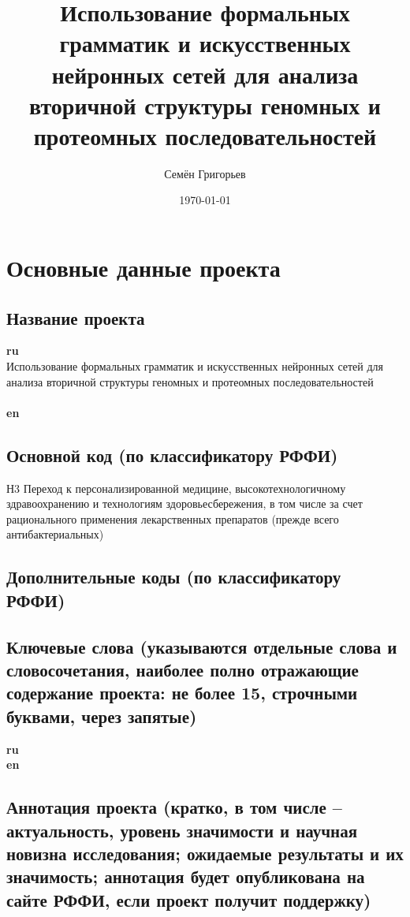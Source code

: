 \documentclass[12pt]{article}  %
\title{Использование формальных грамматик и искусственных нейронных сетей для анализа вторичной структуры геномных и протеомных  последовательностей}
\author{Семён Григорьев}
\date{\today}
\theoremstyle{remark}
\begin{document}

\maketitle

\section{Основные данные проекта}

\subsection{Название проекта}

\textbf{ru}\\
%
Использование формальных грамматик и искусственных нейронных сетей для анализа вторичной структуры геномных и протеомных  последовательностей
\\
\\
\textbf{en}\\

\subsection{Основной код (по классификатору РФФИ)}
%
Н3 Переход к персонализированной медицине, высокотехнологичному здравоохранению и технологиям здоровьесбережения, в том числе за счет рационального применения лекарственных препаратов (прежде всего антибактериальных)

\subsection{Дополнительные коды (по классификатору РФФИ)}

\subsection{Ключевые слова (указываются отдельные слова и словосочетания, наиболее полно отражающие содержание проекта: не более 15, строчными буквами, через запятые)}
\textbf{ru}\\
%

\textbf{en}\\


\subsection{Аннотация проекта (кратко, в том числе – актуальность, уровень значимости и научная новизна исследования; ожидаемые результаты и их значимость; аннотация будет опубликована на сайте РФФИ, если проект получит поддержку)}
\end{document}

